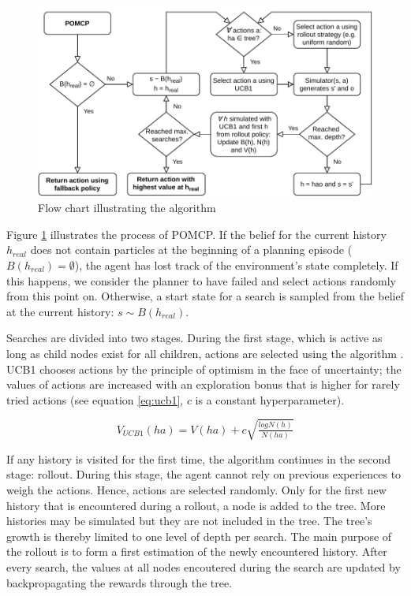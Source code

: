 \begin{figure}[htbp]
    \centerfloat
    \includegraphics[width=1.0\textwidth]{figures/POMCP.pdf}
    \caption{Flow chart illustrating the  algorithm}
    \label{fig:pomcp}
\end{figure}

Figure \ref{fig:pomcp} illustrates the process of POMCP.  If the belief for the current history $h_{real}$ does not contain particles at the beginning of a planning episode ($B(h_{real}) = \emptyset$), the agent has lost track of the environment's state completely. If this happens, we consider the planner to have failed and select actions randomly from this point on. Otherwise, a start state for a search is sampled from the belief at the current history: $ s \sim B(h_ {real})$. 

Searches are divided into two stages. During the first stage, which is active as long as child nodes exist for all children, actions are selected using the  algorithm \parencite{ucb1}. UCB1 chooses actions by the principle of optimism in the face of uncertainty; the values of actions are increased with an exploration bonus that is higher for rarely tried actions (see equation \ref{eq:ucb1}, $c$ is a constant hyperparameter). 

\begin{equation}
    V_{UCB1}(ha) = V(ha) + c\sqrt{\tfrac{log N(h)}{N(ha)}}
    \label{eq:ucb1}
\end{equation}

If any history is visited for the first time, the algorithm continues in the second stage: rollout. During this stage, the agent cannot rely on previous experiences to weigh the actions. Hence, actions are selected randomly. Only for the first new history that is encountered during a rollout, a node is added to the tree. More histories may be simulated but they are not included in the tree. The tree's growth is thereby limited to one level of depth per search. The main purpose of the rollout is to form a first estimation of the newly encountered history. After every search, the values at all nodes encoutered during the search are updated by backpropagating the rewards through the tree.

